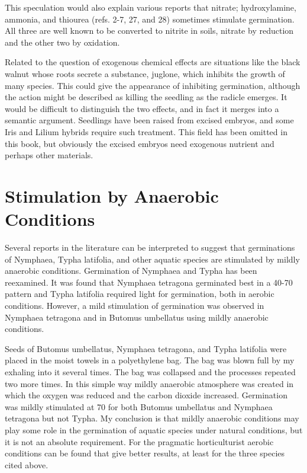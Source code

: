 This speculation would also explain various reports that nitrate; hydroxylamine,
ammonia, and thiourea (refs. 2-7, 27, and 28) sometimes stimulate germination. All
three are well known to be converted to nitrite in soils, nitrate by reduction and the
other two by oxidation.

Related to the question of exogenous chemical effects are situations like the
black walnut whose roots secrete a substance, juglone, which inhibits the growth of
many species. This could give the appearance of inhibiting germination, although the
action might be described as killing the seedling as the radicle emerges. It would be
difficult to distinguish the two effects, and in fact it merges into a semantic argument.
Seedlings have been raised from excised embryos, and some Iris and Lilium
hybrids require such treatment. This field has been omitted in this book, but obviously
the excised embryos need exogenous nutrient and perhaps other materials.

\section[Anaerobic Conditions]{Stimulation by Anaerobic Conditions}

Several reports in the literature
can be interpreted to suggest that germinations of Nymphaea, Typha latifolia, and
other aquatic species are stimulated by mildly anaerobic conditions. Germination of
Nymphaea and Typha has been reexamined. It was found that Nymphaea tetragona
germinated best in a 40-70 pattern and Typha latifolia required light for germination,
both in aerobic conditions. However, a mild stimulation of germination was observed
in Nymphaea tetragona and in Butomus umbellatus using mildly anaerobic conditions.

Seeds of Butomus umbellatus, Nymphaea tetragona, and Typha latifolia were
placed in the moist towels in a polyethylene bag. The bag was blown full by my
exhaling into it several times. The bag was collapsed and the processes repeated two
more times. In this simple way mildly anaerobic atmosphere was created in which
the oxygen was reduced and the carbon dioxide increased. Germination was mildly
stimulated at 70 for both Butomus umbellatus and Nymphaea tetragona but not Typha.
My conclusion is that mildly anaerobic conditions may play some role in the
germination of aquatic species under natural conditions, but it is not an absolute
requirement. For the pragmatic horticulturist aerobic conditions can be found that give
better results, at least for the three species cited above.

